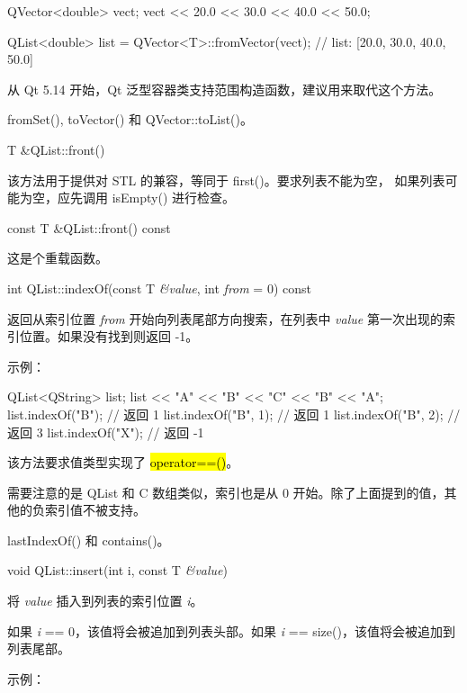 \begin{cppcode}
QVector<double> vect;
vect << 20.0 << 30.0 << 40.0 << 50.0;

QList<double> list = QVector<T>::fromVector(vect);
// list: [20.0, 30.0, 40.0, 50.0]
\end{cppcode}


\begin{notice}
从 Qt 5.14 开始，Qt 泛型容器类支持范围构造函数，建议用来取代这个方法。
\end{notice}

\begin{seeAlso}
fromSet(), toVector() 和 QVector::toList()。
\end{seeAlso}

T \&QList::front()

该方法用于提供对 STL 的兼容，等同于 first()。要求列表不能为空， 如果列表可能为空，应先调用 isEmpty() 进行检查。

const T \&QList::front() const

这是个重载函数。

int QList::indexOf(const T \emph{\&value}, int \emph{from} = 0) const

返回从索引位置 \emph{from} 开始向列表尾部方向搜索，在列表中 \emph{value} 第一次出现的索引位置。如果没有找到则返回 -1。

示例：



\begin{cppcode}
QList<QString> list;
list << "A" << "B" << "C" << "B" << "A";
list.indexOf("B");          // 返回 1
list.indexOf("B", 1);       // 返回 1
list.indexOf("B", 2);       // 返回 3
list.indexOf("X");          // 返回 -1
\end{cppcode}



该方法要求值类型实现了 \hl{operator==()}。

需要注意的是 QList 和 C 数组类似，索引也是从 0 开始。除了上面提到的值，其他的负索引值不被支持。

\begin{seeAlso}
lastIndexOf() 和 contains()。
\end{seeAlso}


void QList::insert(int i, const T \emph{\&value})

将 \emph{value} 插入到列表的索引位置 \emph{i}。

如果 \emph{i} == 0，该值将会被追加到列表头部。如果 \emph{i} == size()，该值将会被追加到列表尾部。

示例：


